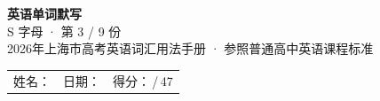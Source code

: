 \documentclass[10pt,a4paper]{article}
\begin{document}
\pagestyle{plain}

\begin{center}
{\LARGE\bfseries 英语单词默写}\\[0.22em]
{\large S 字母 · 第 3 / 9 份}\\[0.18em]
{\small 2026年上海市高考英语词汇用法手册 · 参照普通高中英语课程标准}
\end{center}

\vspace{0.25em}
\noindent\begin{tabular}{@{}p{}@{}p{}@{}p{}@{}}
姓名：\underline{\hspace{2.0cm}} & 日期：\underline{\hspace{2.0cm}} & 得分：\underline{\hspace{1.3cm}}\,/\,47 \\
\end{tabular}

\vspace{0.3em}

\vspace{0.08em}
\end{document}
